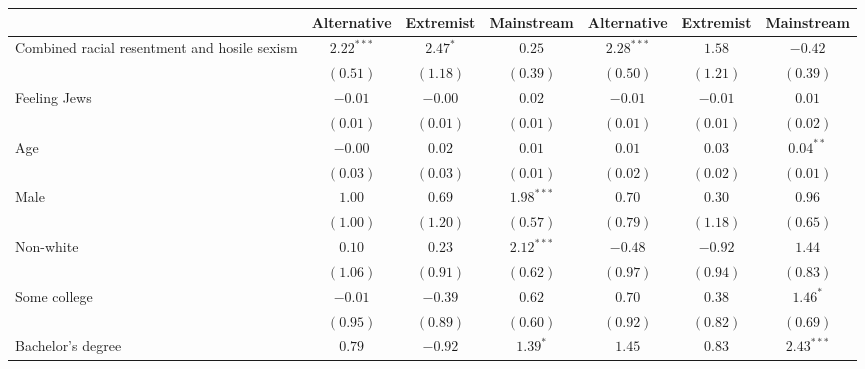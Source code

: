 
\usepackage{booktabs}

\begin{table}
\begin{center}
\begin{tabular}{l c c c c c c}
\toprule
 & Alternative & Extremist & Mainstream & Alternative & Extremist & Mainstream \\
\midrule
Combined racial resentment and hosile sexism & $2.22^{***}$ & $2.47^{*}$   & $0.25$       & $2.28^{***}$ & $1.58$       & $-0.42$       \\
                                             & $(0.51)$     & $(1.18)$     & $(0.39)$     & $(0.50)$     & $(1.21)$     & $(0.39)$      \\
Feeling Jews                                 & $-0.01$      & $-0.00$      & $0.02$       & $-0.01$      & $-0.01$      & $0.01$        \\
                                             & $(0.01)$     & $(0.01)$     & $(0.01)$     & $(0.01)$     & $(0.01)$     & $(0.02)$      \\
Age                                          & $-0.00$      & $0.02$       & $0.01$       & $0.01$       & $0.03$       & $0.04^{**}$   \\
                                             & $(0.03)$     & $(0.03)$     & $(0.01)$     & $(0.02)$     & $(0.02)$     & $(0.01)$      \\
Male                                         & $1.00$       & $0.69$       & $1.98^{***}$ & $0.70$       & $0.30$       & $0.96$        \\
                                             & $(1.00)$     & $(1.20)$     & $(0.57)$     & $(0.79)$     & $(1.18)$     & $(0.65)$      \\
Non-white                                    & $0.10$       & $0.23$       & $2.12^{***}$ & $-0.48$      & $-0.92$      & $1.44$        \\
                                             & $(1.06)$     & $(0.91)$     & $(0.62)$     & $(0.97)$     & $(0.94)$     & $(0.83)$      \\
Some college                                 & $-0.01$      & $-0.39$      & $0.62$       & $0.70$       & $0.38$       & $1.46^{*}$    \\
                                             & $(0.95)$     & $(0.89)$     & $(0.60)$     & $(0.92)$     & $(0.82)$     & $(0.69)$      \\
Bachelor's degree                            & $0.79$       & $-0.92$      & $1.39^{*}$   & $1.45$       & $0.83$       & $2.43^{***}$  \\

\end{tabular}
\end{center}
\end{table}
